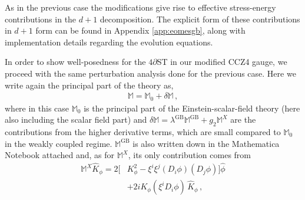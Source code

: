 \documentclass[reprint,aps,amsmath,amssymb,twoside,prd,showkeys,superscriptaddress,nofootinbib]{revtex4-2}
\begin{document}
As in the previous case the modifications give rise to effective stress-energy contributions in the $d+1$ decomposition. The explicit form of these contributions in $d+1$ form can be found in Appendix \ref{app:eomesgb}, along with implementation details regarding the evolution equations.


In order to show well-posedness for the $4\partial$ST in our modified CCZ4 gauge, we proceed with the same perturbation analysis done for the previous case. Here we write again the principal part of the theory as,
\begin{eqnarray}
    \mathbb{M}=\mathbb{M}_0+\delta\mathbb{M}\,,
\end{eqnarray}
where in this case ${\mathbb M}_0$ is the principal part of the Einstein-scalar-field theory (here also including the scalar field part) and $\delta\mathbb{M}=\lambda^{\text{GB}}\mathbb{M}^{\text{GB}}+g_2\mathbb{M}^{X}$ are the contributions from the higher derivative terms, which are small compared to $\mathbb M_0$ in the weakly coupled regime.
${\mathbb M}^{\text{GB}}$ is also written down in the Mathematica Notebook attached \cite{supp} and, as for ${\mathbb M}^{X}$, its only contribution comes from
\begin{align}
{\mathbb M}^X\hat{K}_{\phi}=2\big[&K_{\phi}^2-\xi^i\xi^j(D_i\phi)(D_j\phi)\big]\hat{\phi}\nonumber\\&+2iK_{\phi}(\xi^iD_i\phi)\,\hat{K}_{\phi}\,,
\end{align}
\end{document}
